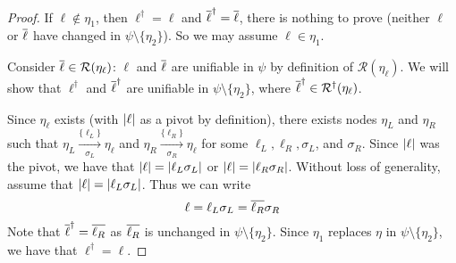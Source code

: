 \begin{proof}
If $\ell \notin \eta_1$, then $\ell^\dagger =\ell$ and $\overline{\ell}^\dagger=\overline{\ell}$, there is nothing to prove (neither $\ell$ or $\overline{\ell}$ have changed in $\psi\setminus\{\eta_2\}$). So we may assume $\ell\in \eta_1$.

Consider $\overline{\ell} \in \mathcal{R}(\eta_\ell)$: $\ell$ and $\overline{\ell}$ are unifiable in $\psi$ by definition of $\mathcal{R}(\eta_\ell)$. We will show that $\ell^\dagger$ and $\overline{\ell}^\dagger$ are unifiable in $\psi\setminus\{\eta_2\}$, where $\overline{\ell}^\dagger\in \mathcal{R}^\dagger(\eta_\ell)$.

Since $\eta_\ell$ exists (with $\lvert\ell\rvert$ as a pivot by definition), there exists nodes $\eta_L$ and $\eta_R$ such that $\eta_L \xrightarrow[\sigma_L]{\{\ell_L\} } \eta_\ell$ and $\eta_R \xrightarrow[\sigma_R]{\{\ell_R\} } \eta_\ell$ for some $\ell_L,\ell_R,\sigma_L$, and $\sigma_R$.
Since $\lvert\ell\rvert$ was the pivot, we have that $\lvert\ell\rvert=\lvert\ell_L\sigma_L\rvert$ or $\lvert\ell\rvert=\lvert\ell_R\sigma_R\rvert$. Without loss of generality, assume that  $\lvert\ell\rvert=\lvert\ell_L\sigma_L\rvert$.
Thus we can write
$$\ell = \ell_L\sigma_L =\overline{\ell_R}\sigma_R$$
Note that $\overline{\ell}^\dagger=\overline{\ell_R}$ as $\overline{\ell_R}$ is unchanged in $\psi \setminus\{\eta_2\}$.
Since $\eta_1$ replaces $\eta$ in $\psi\setminus\{\eta_2\}$, we have that $\ell^\dagger=\ell$. 


\end{proof}



